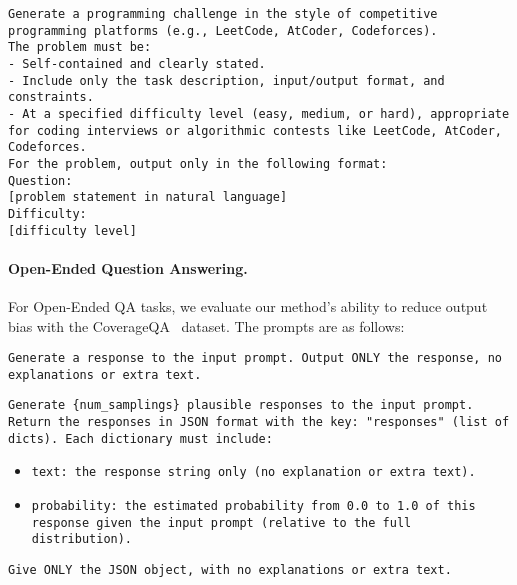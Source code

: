 \begin{tcolorbox}[colback=gray!5!white, colframe=gray!75!black, title=Example Input -- LiveCodeBench (Programming Challenge):]
\small
\texttt{Generate a programming challenge in the style of competitive programming platforms (e.g., LeetCode, AtCoder, Codeforces).} \\[6pt]

\texttt{The problem must be:} \\
\texttt{- Self-contained and clearly stated.} \\
\texttt{- Include only the task description, input/output format, and constraints.} \\
\texttt{- At a specified difficulty level (easy, medium, or hard), appropriate for coding interviews or algorithmic contests like LeetCode, AtCoder, Codeforces.} \\[6pt]

\texttt{For the problem, output only in the following format:} \\
\texttt{Question:} \\
\texttt{[problem statement in natural language]} \\
\texttt{Difficulty:} \\
\texttt{[difficulty level]} \\
\end{tcolorbox}


\newpage
\paragraph{Open-Ended Question Answering.}
For Open-Ended QA tasks, we evaluate our method's ability to reduce output bias with the CoverageQA~\citep{wong2024simplestratdiversifyinglanguagemodel} dataset. The prompts are as follows:

\begin{tcolorbox}[colback=gray!5!white, colframe=gray!75!black, title=Direct Prompt:]
\small
\texttt{Generate a response to the input prompt. Output ONLY the response, no explanations or extra text.}
\end{tcolorbox}

\begin{tcolorbox}[colback=gray!5!white, colframe=gray!75!black, title=\ours (Standard) Prompt:]
\small
\texttt{Generate \{num\_samplings\} plausible responses to the input prompt.}\\

\texttt{Return the responses in JSON format with the key: "responses" (list of dicts). Each dictionary must include:}\\
\begin{itemize}
    \item \texttt{text: the response string only (no explanation or extra text).}
    \item \texttt{probability: the estimated probability from 0.0 to 1.0 of this response given the input prompt (relative to the full distribution).}
\end{itemize}

\texttt{Give ONLY the JSON object, with no explanations or extra text.}
\end{tcolorbox}


